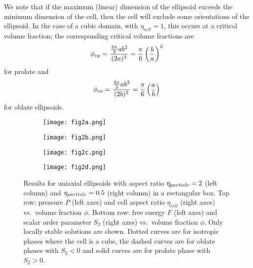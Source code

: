 \documentclass{article}
\begin{document}
We note that if the maximum (linear) dimension of the ellipsoid exceeds the
minimum dimension of the cell, then the cell will exclude some orientations
of the ellipsoid. In the case of a cubic domain, with $\eta_{cell} = 1$,
this occurs at a critical volume fraction; the corresponding critical volume
fractions are 
\begin{equation}
\phi _{cp}=\frac{\frac{4\pi }{3}ab^{2}}{(2a)^{3}}=\frac{\pi }{6}\left( \frac{%
b}{a}\right) ^{2}
\end{equation}%
for prolate and%
\begin{equation}
\phi _{co}=\frac{\frac{4\pi }{3}ab^{2}}{(2b)^{3}}=\frac{\pi }{6}\left( \frac{%
a}{b}\right)
\end{equation}%
for oblate ellipsoids.

\begin{figure}[h]
	\centering
\begin{subfigure}[c]{0.45\linewidth}
	\centering
	\texttt{[image: fig2a.png]}
	\caption{}
\end{subfigure}
\begin{subfigure}[c]{0.45\linewidth}
	\texttt{[image: fig2b.png]}
	\caption{}
\end{subfigure}
\begin{subfigure}[c]{0.45\linewidth}
	\centering
	\texttt{[image: fig2c.png]}
	\caption{} 
\end{subfigure}
\begin{subfigure}[c]{0.45\linewidth}
	\centering
	\texttt{[image: fig2d.png]}
	\caption{}
\end{subfigure}
\caption{Results for uniaxial ellipsoids with aspect ratio $\protect\eta%
_{particle}=2$ (left column) and $\protect\eta_{particle}=0.5$ (right
column) in a rectangular box. Top row: pressure $P$ (left axes) and cell aspect ratio $\eta_{cell}$ (right axes) vs.~volume fraction $\phi$. Bottom row: free energy $F$ (left axes) and scalar order parameter $S_2$ (right axes) vs.~volume fraction $\phi$.  Only locally stable solutions are shown. Dotted curves are for
isotropic phases where the cell is a cube, the dashed curves are for oblate
phases with $S_2<0$ and solid curves are for prolate phase with $S_2>0$.}
\label{fig:bif}
\end{figure}
\end{document}
